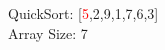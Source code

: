 \documentclass[preview]{standalone}
\begin{document}
\begin{center}
QuickSort: [\textcolor{red}{5},2,9,1,7,6,3]\\Array Size: 7
\end{center}
\end{document}
